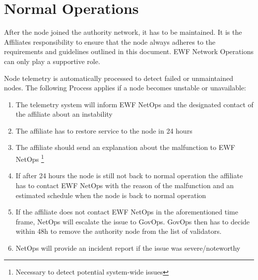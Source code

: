 
\section{Normal Operations}

After the node joined the authority network, it has to be maintained. It is the Affiliates responsibility to ensure that the node always adheres to the requirements and guidelines outlined in this document.
EWF Network Operations can only play a supportive role.

Node telemetry is automatically processed to detect failed or unmaintained nodes. The following Process applies if a node becomes unstable or unavailable:

\begin{enumerate}
    \item The telemetry system will inform EWF NetOps and the designated contact of the affiliate about an instability
    \item The affiliate has to restore service to the node in 24 hours
    \item The affiliate should send an explanation about the malfunction to EWF NetOps \footnote{Necessary to detect potential system-wide issues}
    \item If after 24 hours the node is still not back to normal operation the affiliate has to contact EWF NetOps with the reason of the malfunction and an estimated schedule when the node is back to normal operation
    \item If the affiliate does not contact EWF NetOps in the aforementioned time frame, NetOps will escalate the issue to GovOps. GovOps then has to decide within 48h to remove the authority node from the list of validators.
    \item NetOps will provide an incident report if the issue was severe/noteworthy
\end{enumerate}
